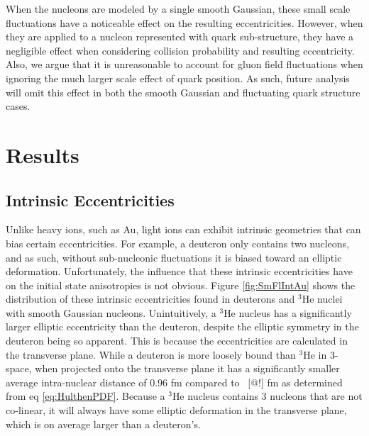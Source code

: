 \documentclass[twocolumn,showpacs,amsfonts,aps,prc,nofootinbib,floatfix]{revtex4}
\begin{document}
When the nucleons are modeled by a single smooth Gaussian, these small scale fluctuations have a noticeable effect on the resulting eccentricities. However, when they are applied to a nucleon represented with quark sub-structure, they have a negligible effect when considering collision probability and resulting eccentricity. Also, we argue that it is unreasonable to account for gluon field fluctuations when ignoring the much larger scale effect of quark position. As such, future analysis will omit this effect in both the smooth Gaussian and fluctuating quark structure cases.

\section{Results}
\label{sec:Results}

\subsection{Intrinsic Eccentricities}
\label{subsec:IntrinsicEccentricities}
Unlike heavy ions, such as Au, light ions can exhibit intrinsic geometries that can bias certain eccentricities. For example, a deuteron only contains two nucleons, and as such, without sub-nucleonic fluctuations it is biased toward an elliptic deformation. Unfortunately, the influence that these intrinsic eccentricities have on the initial state anisotropies is not obvious. Figure \ref{fig:SmFlIntAu} shows the distribution of these intrinsic eccentricities found in deuterons and $^3$He nuclei with smooth Gaussian nucleons. Unintuitively, a $^3$He nucleus has a significantly larger elliptic eccentricity than the deuteron, despite the elliptic symmetry in the deuteron being so apparent. This is because the eccentricities are calculated in the transverse plane. While a deuteron is more loosely bound than $^3$He in 3-space, when projected onto the transverse plane it has a significantly smaller average intra-nuclear distance of 0.96 fm compared to ~[@!] fm as determined from eq \ref{eq:HulthenPDF}. Because a $^3$He nucleus contains 3 nucleons that are not co-linear, it will always have some elliptic deformation in the transverse plane, which is on average larger than a deuteron's. 
\end{document}
